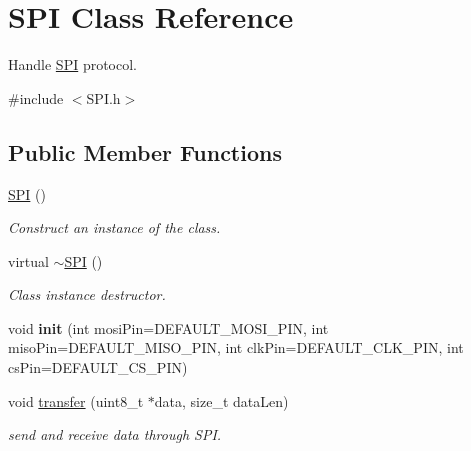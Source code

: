 \hypertarget{class_s_p_i}{}\section{S\+PI Class Reference}
\label{class_s_p_i}


Handle \hyperlink{class_s_p_i}{S\+PI} protocol.  




{\ttfamily \#include $<$S\+P\+I.\+h$>$}

\subsection*{Public Member Functions}
\begin{DoxyCompactItemize}
\item 
\hyperlink{class_s_p_i_a2ba081c29fbdecc704c6bf00b24d5205}{S\+PI} ()
\begin{DoxyCompactList}\small\item\em Construct an instance of the class. \end{DoxyCompactList}\item 
virtual \hyperlink{class_s_p_i_a6babebf1ea3e8ff0330f43a3e2312ac4}{$\sim$\+S\+PI} ()\hypertarget{class_s_p_i_a6babebf1ea3e8ff0330f43a3e2312ac4}{}\label{class_s_p_i_a6babebf1ea3e8ff0330f43a3e2312ac4}

\begin{DoxyCompactList}\small\item\em Class instance destructor. \end{DoxyCompactList}\item 
void {\bfseries init} (int mosi\+Pin=D\+E\+F\+A\+U\+L\+T\+\_\+\+M\+O\+S\+I\+\_\+\+P\+IN, int miso\+Pin=D\+E\+F\+A\+U\+L\+T\+\_\+\+M\+I\+S\+O\+\_\+\+P\+IN, int clk\+Pin=D\+E\+F\+A\+U\+L\+T\+\_\+\+C\+L\+K\+\_\+\+P\+IN, int cs\+Pin=D\+E\+F\+A\+U\+L\+T\+\_\+\+C\+S\+\_\+\+P\+IN)\hypertarget{class_s_p_i_a832556869c632024fe6ab92473854131}{}\label{class_s_p_i_a832556869c632024fe6ab92473854131}

\item 
void \hyperlink{class_s_p_i_a3d0d6d9b84a7191b4a95971eee25f746}{transfer} (uint8\+\_\+t $\ast$data, size\+\_\+t data\+Len)
\begin{DoxyCompactList}\small\item\em send and receive data through S\+PI. \end{DoxyCompactList}\end{DoxyCompactItemize}
